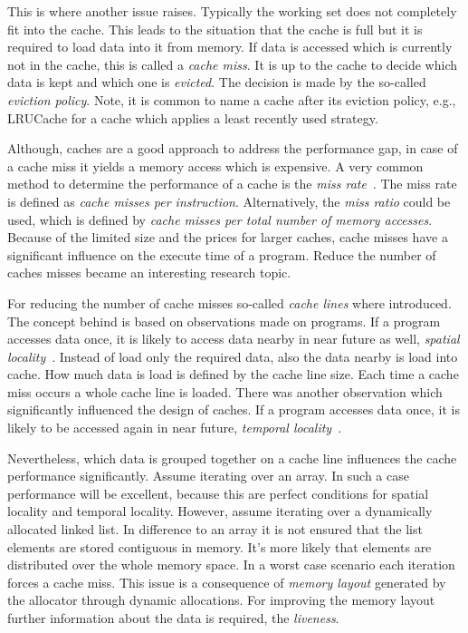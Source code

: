 \documentclass[onecolumn, openright, master, english, signatures]{dbrgrptt}
\begin{document}
This is where another issue raises. Typically the working set does not completely fit into the cache. This leads to the situation that the cache is full but it is required to load data into it from memory. If data is accessed which is currently not in the cache, this is called a \emph{cache miss}. It is up to the cache to decide which data is kept and which one is \emph{evicted}. The decision is made by the so-called \emph{eviction policy}. Note, it is common to name a cache after its eviction policy, e.g., LRUCache for a cache which applies a least recently used strategy.

Although, caches are a good approach to address the performance gap, in case of a cache miss it yields a memory access which is expensive. A very common method to determine the performance of a cache is the \emph{miss rate}~\cite{patterson2011computer}. The miss rate is defined as \emph{cache misses per instruction}. Alternatively, the \emph{miss ratio} could be used, which is defined by \emph{cache misses per total number of memory accesses}. Because of the limited size and the prices for larger caches, cache misses have a significant influence on the execute time of a program. Reduce the number of caches misses became an interesting research topic.

For reducing the number of cache misses so-called \emph{cache lines} where introduced. The concept behind is based on observations made on programs. If a program accesses data once, it is likely to access data nearby in near future as well, \emph{spatial locality}~\cite{jacob2010memory}. Instead of load only the required data, also the data nearby is load into cache. How much data is load is defined by the cache line size. Each time a cache miss occurs a whole cache line is loaded. There was another observation which significantly influenced the design of caches. If a program accesses data once, it is likely to be accessed again in near future, \emph{temporal locality}~\cite{jacob2010memory}.

Nevertheless, which data is grouped together on a cache line influences the cache performance significantly. Assume iterating over an array. In such a case performance will be excellent, because this are perfect conditions for spatial locality and temporal locality. However, assume iterating over a dynamically allocated linked list. In difference to an array it is not ensured that the list elements are stored contiguous in memory. It's more likely that elements are distributed over the whole memory space. In a worst case scenario each iteration forces a cache miss. This issue is a consequence of \emph{memory layout} generated by the allocator through dynamic allocations. For improving the memory layout further information about the data is required, the \emph{liveness}.
\end{document}
